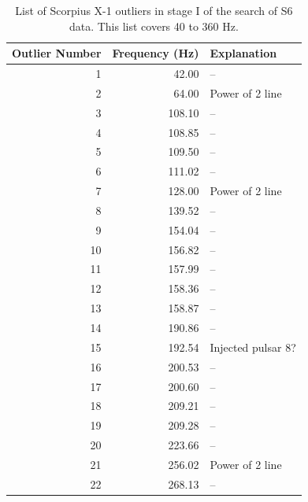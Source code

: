 \begin{table}
\begin{center}
\begin{tabular}{r r l}
Outlier Number & Frequency (Hz) & Explanation \\
\hline
1 & 42.00 & -- \\
2 & 64.00 & Power of 2 line \\
3 & 108.10 & -- \\
4 & 108.85 & -- \\
5 & 109.50 & -- \\
6 & 111.02 & -- \\
7 & 128.00 & Power of 2 line \\
8 & 139.52 & -- \\
9 & 154.04 & -- \\
10 & 156.82 & -- \\
11 & 157.99 & -- \\
12 & 158.36 & -- \\
13 & 158.87 & -- \\
14 & 190.86 & -- \\
15 & 192.54 & Injected pulsar 8? \\
16 & 200.53 & -- \\
17 & 200.60 & -- \\
18 & 209.21 & -- \\
19 & 209.28 & -- \\
20 & 223.66 & -- \\
21 & 256.02 & Power of 2 line \\
22 & 268.13 & -- \\
\end{tabular}
\caption{List of Scorpius X-1 outliers in stage I of the search of S6 data. This list covers 40 to 360 Hz.}
\label{ScoX1S6outlierTable}
\end{center}
\end{table}

